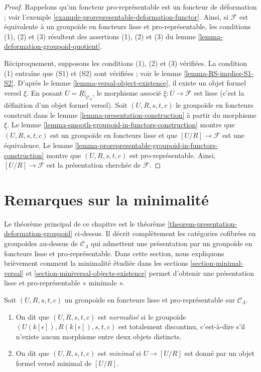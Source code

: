 \begin{proof}
Rappelons qu'un foncteur pro-représentable est un foncteur de déformation ;
voir l'exemple \ref{example-prorepresentable-deformation-functor}. Ainsi, si
$\mathcal{F}$ est équivalente à un groupoïde en foncteurs lisse et
pro-représentable, les conditions (1), (2) et (3) résultent des assertions
(1), (2) et (3) du lemme \ref{lemma-deformation-groupoid-quotient}.

\medskip\noindent
Réciproquement, supposons les conditions (1), (2) et (3) vérifiées. La
condition (1) entraîne que (S1) et (S2) sont vérifiées ; voir le lemme
\ref{lemma-RS-implies-S1-S2}. D'après le lemme
\ref{lemma-versal-object-existence}, il existe un objet formel versel $\xi$.
En posant $U = \underline{R}|_{\mathcal{C}_\Lambda}$, le morphisme associé
$\underline{\xi} : U \to \mathcal{F}$ est lisse (c'est la définition d'un
objet formel versel). Soit $(U, R, s, t, c)$ le groupoïde en foncteurs construit
dans le lemme \ref{lemma-presentation-construction} à partir du morphisme
$\underline{\xi}$. Le lemme
\ref{lemma-smooth-groupoid-in-functors-construction} montre que
$(U, R, s, t, c)$ est un groupoïde en foncteurs lisse et que
$[U/R] \to \mathcal{F}$ est une équivalence. Le lemme
\ref{lemma-prorepresentable-groupoid-in-functors-construction} montre que
$(U, R, s, t, c)$ est pro-représentable. Ainsi,
$[U/R] \to \mathcal{F}$ est la présentation cherchée de $\mathcal{F}$.
\end{proof}








\section{Remarques sur la minimalité}
\label{section-minimality}

\noindent
Le théorème principal de ce chapitre est le théorème
\ref{theorem-presentation-deformation-groupoid} ci-dessus. Il décrit
complètement les catégories cofibrées en groupoïdes au-dessus de
$\mathcal{C}_\Lambda$ qui admettent une présentation par un groupoïde en foncteurs
lisse et pro-représentable. Dans cette section, nous expliquons brièvement
comment la minimalité étudiée dans les sections \ref{section-minimal-versal} et
\ref{section-miniversal-objects-existence} permet d'obtenir une présentation
lisse et pro-représentable « minimale ».

\begin{definition}
\label{definition-minimal-groupoid-in-functors}
Soit $(U, R, s, t, c)$ un groupoïde en foncteurs lisse et pro-représentable sur
$\mathcal{C}_\Lambda$.
\begin{enumerate}
\item On dit que $(U, R, s, t, c)$ est {\it normalisé} si le groupoïde
$(U(k[\epsilon]), R(k[\epsilon]), s, t, c)$ est totalement discontinu,
c'est-à-dire s'il n'existe aucun morphisme entre deux objets distincts.
\item On dit que $(U, R, s, t, c)$ est {\it minimal} si $U \to [U/R]$ est
donné par un objet formel versel minimal de $[U/R]$.
\end{enumerate}
\end{definition}

